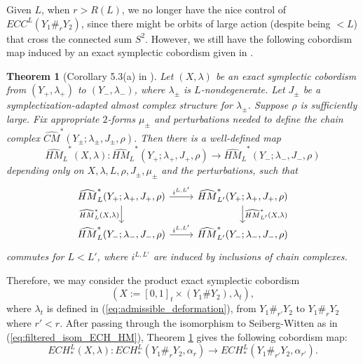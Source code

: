\documentclass{article}
\numberwithin{equation}{section}
\newtheorem{theorem}{Theorem}[section]
\theoremstyle{definition}
\begin{document}
Given $L$, when $r>R(L)$, we no longer have the nice control of $ECC^L(Y_1 \#_r Y_2)$, since there might be orbits of large action (despite being $<L$) that cross the connected sum $S^2$. However, we still have the following cobordism map induced by an exact symplectic cobordism given in \cite{HT_Chord_II}.

\begin{theorem}[Corollary 5.3(a) in \cite{HT_Chord_II}]
\label{thm:exact_cobordism_SW}
    Let $(X,\lambda)$ be an exact symplectic cobordism from $(Y_+, \lambda_+)$ to $(Y_-, \lambda_-)$, where $\lambda_\pm$ is $L$-nondegenerate. Let $J_\pm$ be a symplectization-adapted almost complex structure for $\lambda_\pm$. Suppose $\rho$ is sufficiently large. Fix appropriate $2$-forms $\mu_\pm$ and perturbations needed to define the chain complex $\widehat{CM}^*(Y_\pm; \lambda_\pm, J_\pm, \rho)$. Then there is a well-defined map
    \begin{equation}
        {\widehat{HM}_L}^*(X, \lambda):{\widehat{HM}_L}^*(Y_+; \lambda_+, J_+, \rho)\longrightarrow {\widehat{HM}_L}^*(Y_-; \lambda_-, J_-, \rho)
    \end{equation}
    depending only on $X, \lambda, L, \rho, J_\pm, \mu_\pm$ and the perturbations, such that
\begin{equation}
\label{diag:SW_four}
\begin{tikzcd}
{\widehat{HM}_L}^*(Y_+; \lambda_+, J_+, \rho) \arrow{r}{i^{L, L'}} \arrow[swap]{d}{{\widehat{HM}_{L}}^*(X, \lambda)} & {\widehat{HM}_{L'}}^*(Y_+; \lambda_+, J_+, \rho) \arrow{d}{{\widehat{HM}_{L'}}^*(X, \lambda)} \\%
{\widehat{HM}_{L}}^*(Y_-; \lambda_-, J_-, \rho) \arrow{r}{i^{L,L'}}& {\widehat{HM}_{L'}}^*(Y_-; \lambda_-, J_-, \rho)
\end{tikzcd}
\end{equation}
commutes for $L<L'$, where $i^{L,L'}$ are induced by inclusions of chain complexes.
\end{theorem}

Therefore, we may consider the product exact symplectic cobordism 
$$(X := [0,1]_t \times (Y_1 \# Y_2), \lambda_t),$$
where $\lambda_t$ is defined in (\ref{eq:admissible_deformation}), from $Y_1 \#_{r'} Y_2$ to $Y_1 \#_r Y_2$ where $r'<r$. After passing through the isomorphism to Seiberg-Witten as in (\ref{eq:filtered_isom_ECH_HM}), Theorem \ref{thm:exact_cobordism_SW} gives the following cobordism map:
\begin{equation}
\label{eq:exact_cobord}
    ECH_*^L(X, \lambda): ECH_*^L(Y_1 \#_{r} Y_2, \alpha_r) \longrightarrow ECH_*^L(Y_1 \#_{r'} Y_2, \alpha_{r'}).
\end{equation}
\end{document}

